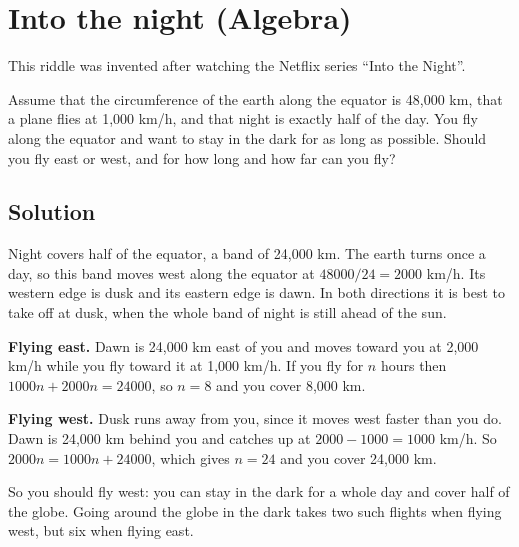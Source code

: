 \section {Into the night (Algebra)}

This riddle was invented after watching the Netflix series ``Into the Night''.

Assume that the circumference of the earth along the equator is 48,000 km, that a plane flies at 1,000 km/h,
and that night is exactly half of the day. You fly along the equator and want to stay in the dark for as long as possible.
Should you fly east or west, and for how long and how far can you fly?

\subsection{Solution}

Night covers half of the equator, a band of 24,000 km.
The earth turns once a day, so this band moves west along the equator at $48000/24 = 2000$ km/h.
Its western edge is dusk and its eastern edge is dawn.
In both directions it is best to take off at dusk, when the whole band of night is still ahead of the sun.

\textbf{Flying east.} Dawn is 24,000 km east of you and moves toward you at 2,000 km/h while you fly toward it at 1,000 km/h.
If you fly for $n$ hours then $1000n + 2000n = 24000$, so $n=8$ and you cover 8,000 km.

\textbf{Flying west.} Dusk runs away from you, since it moves west faster than you do.
Dawn is 24,000 km behind you and catches up at $2000 - 1000 = 1000$ km/h.
So $2000n = 1000n + 24000$, which gives $n=24$ and you cover 24,000 km.

So you should fly west: you can stay in the dark for a whole day and cover half of the globe.
Going around the globe in the dark takes two such flights when flying west, but six when flying east.
